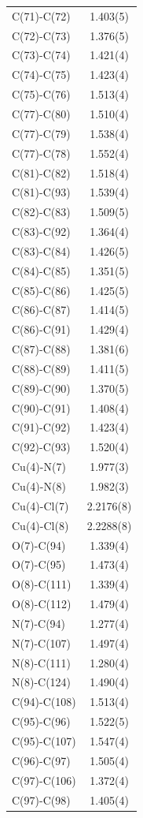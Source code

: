 \begin{center}
{\begin{supertabular}{p{1.5in}c}
C(71)-C(72) &1.403(5)\\
C(72)-C(73) &1.376(5)\\
C(73)-C(74) &1.421(4)\\
C(74)-C(75) &1.423(4)\\
C(75)-C(76) &1.513(4)\\
C(77)-C(80) &1.510(4)\\
C(77)-C(79) &1.538(4)\\
C(77)-C(78) &1.552(4)\\
C(81)-C(82) &1.518(4)\\
C(81)-C(93) &1.539(4)\\
C(82)-C(83) &1.509(5)\\
C(83)-C(92) &1.364(4)\\
C(83)-C(84) &1.426(5)\\
C(84)-C(85) &1.351(5)\\
C(85)-C(86) &1.425(5)\\
C(86)-C(87) &1.414(5)\\
C(86)-C(91) &1.429(4)\\
C(87)-C(88) &1.381(6)\\
C(88)-C(89) &1.411(5)\\
C(89)-C(90) &1.370(5)\\
C(90)-C(91) &1.408(4)\\
C(91)-C(92) &1.423(4)\\
C(92)-C(93) &1.520(4)\\
Cu(4)-N(7) &1.977(3)\\
Cu(4)-N(8) &1.982(3)\\
Cu(4)-Cl(7) &2.2176(8)\\
Cu(4)-Cl(8) &2.2288(8)\\
O(7)-C(94) &1.339(4)\\
O(7)-C(95) &1.473(4)\\
O(8)-C(111) &1.339(4)\\
O(8)-C(112) &1.479(4)\\
N(7)-C(94) &1.277(4)\\
N(7)-C(107) &1.497(4)\\
N(8)-C(111) &1.280(4)\\
N(8)-C(124) &1.490(4)\\
C(94)-C(108) &1.513(4)\\
C(95)-C(96) &1.522(5)\\
C(95)-C(107) &1.547(4)\\
C(96)-C(97) &1.505(4)\\
C(97)-C(106) &1.372(4)\\
C(97)-C(98) &1.405(4)\\

\end{supertabular}}
\end{center}
